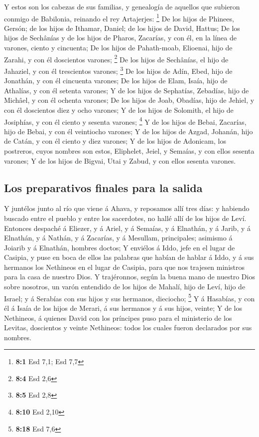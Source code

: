  Y estos son los cabezas de sus familias, y genealogía de
aquellos que subieron conmigo de Babilonia, reinando el rey Artajerjes:
\footnote{\textbf{8:1} Esd 7,1; Esd 7,7}  De los hijos de
Phinees, Gersón; de los hijos de Ithamar, Daniel; de los hijos de David,
Hattus;  De los hijos de Sechânías y de los hijos de Pharos,
Zacarías, y con él, en la línea de varones, ciento y cincuenta;
 De los hijos de Pahath-moab, Elioenai, hijo de Zarahi, y
con él doscientos varones; \footnote{\textbf{8:4} Esd 2,6} 
De los hijos de Sechânías, el hijo de Jahaziel, y con él trescientos
varones; \footnote{\textbf{8:5} Esd 2,8}  De los hijos de
Adín, Ebed, hijo de Jonathán, y con él cincuenta varones; 
De los hijos de Elam, Isaía, hijo de Athalías, y con él setenta varones;
 Y de los hijos de Sephatías, Zebadías, hijo de Michâel, y
con él ochenta varones;  De los hijos de Joab, Obadías, hijo
de Jehiel, y con él doscientos diez y ocho varones;  Y de
los hijos de Solomith, el hijo de Josiphías, y con él ciento y sesenta
varones; \footnote{\textbf{8:10} Esd 2,10}  Y de los hijos
de Bebai, Zacarías, hijo de Bebai, y con él veintiocho varones;
 Y de los hijos de Azgad, Johanán, hijo de Catán, y con él
ciento y diez varones;  Y de los hijos de Adonicam, los
postreros, cuyos nombres son estos, Eliphelet, Jeiel, y Semaías, y con
ellos sesenta varones;  Y de los hijos de Bigvai, Utai y
Zabud, y con ellos sesenta varones.

\hypertarget{los-preparativos-finales-para-la-salida}{%
\subsection{Los preparativos finales para la
salida}\label{los-preparativos-finales-para-la-salida}}

 Y juntélos junto al río que viene á Ahava, y reposamos
allí tres días: y habiendo buscado entre el pueblo y entre los
sacerdotes, no hallé allí de los hijos de Leví.  Entonces
despaché á Eliezer, y á Ariel, y á Semaías, y á Elnathán, y á Jarib, y á
Elnathán, y á Nathán, y á Zacarías, y á Mesullam, principales; asimismo
á Joiarib y á Elnathán, hombres doctos;  Y enviélos á Iddo,
jefe en el lugar de Casipia, y puse en boca de ellos las palabras que
habían de hablar á Iddo, y á sus hermanos los Nethineos en el lugar de
Casipia, para que nos trajesen ministros para la casa de nuestro Dios.
 Y trajéronnos, según la buena mano de nuestro Dios sobre
nosotros, un varón entendido de los hijos de Mahalí, hijo de Leví, hijo
de Israel; y á Serabías con sus hijos y sus hermanos, dieciocho;
\footnote{\textbf{8:18} Esd 7,6}  Y á Hasabías, y con él á
Isaía de los hijos de Merari, á sus hermanos y á sus hijos, veinte;
 Y de los Nethineos, á quienes David con los príncipes puso
para el ministerio de los Levitas, doscientos y veinte Nethineos: todos
los cuales fueron declarados por sus nombres.

